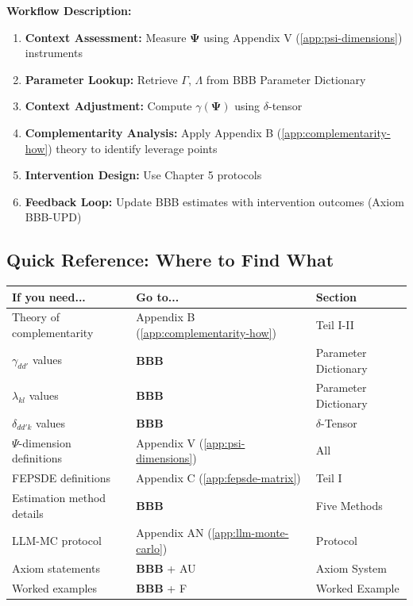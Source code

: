\documentclass[11pt,a4paper]{article}
\theoremstyle{definition}
\begin{document}
\textbf{Workflow Description:}
\begin{enumerate}
    \item \textbf{Context Assessment:} Measure $\boldsymbol{\Psi}$ using Appendix V (\ref{app:psi-dimensions}) instruments
    \item \textbf{Parameter Lookup:} Retrieve $\Gamma$, $\Lambda$ from BBB Parameter Dictionary
    \item \textbf{Context Adjustment:} Compute $\gamma(\boldsymbol{\Psi})$ using $\delta$-tensor
    \item \textbf{Complementarity Analysis:} Apply Appendix B (\ref{app:complementarity-how}) theory to identify leverage points
    \item \textbf{Intervention Design:} Use Chapter 5 protocols
    \item \textbf{Feedback Loop:} Update BBB estimates with intervention outcomes (Axiom BBB-UPD)
\end{enumerate}

\subsection{Quick Reference: Where to Find What}

\begin{center}
\begin{tabular}{lll}
\toprule
\textbf{If you need...} & \textbf{Go to...} & \textbf{Section} \\
\midrule
Theory of complementarity & Appendix B (\ref{app:complementarity-how}) & Teil I-II \\
$\gamma_{dd'}$ values & \textbf{BBB} & Parameter Dictionary \\
$\lambda_{kl}$ values & \textbf{BBB} & Parameter Dictionary \\
$\delta_{dd'k}$ values & \textbf{BBB} & $\delta$-Tensor \\
$\Psi$-dimension definitions & Appendix V (\ref{app:psi-dimensions}) & All \\
FEPSDE definitions & Appendix C (\ref{app:fepsde-matrix}) & Teil I \\
Estimation method details & \textbf{BBB} & Five Methods \\
LLM-MC protocol & Appendix AN (\ref{app:llm-monte-carlo}) & Protocol \\
Axiom statements & \textbf{BBB} + AU & Axiom System \\
Worked examples & \textbf{BBB} + F & Worked Example \\
\bottomrule
\end{tabular}
\end{center}
\end{document}
